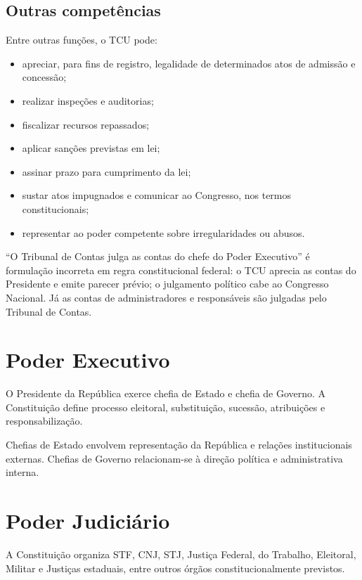 \subsection{Outras competências}

Entre outras funções, o TCU pode:
\begin{itemize}
\item apreciar, para fins de registro, legalidade de determinados atos de admissão e concessão;
\item realizar inspeções e auditorias;
\item fiscalizar recursos repassados;
\item aplicar sanções previstas em lei;
\item assinar prazo para cumprimento da lei;
\item sustar atos impugnados e comunicar ao Congresso, nos termos constitucionais;
\item representar ao poder competente sobre irregularidades ou abusos.
\end{itemize}

\begin{cebraspe}
``O Tribunal de Contas julga as contas do chefe do Poder Executivo'' é formulação incorreta em regra constitucional federal: o TCU aprecia as contas do Presidente e emite parecer prévio; o julgamento político cabe ao Congresso Nacional. Já as contas de administradores e responsáveis são julgadas pelo Tribunal de Contas.
\end{cebraspe}

\section{Poder Executivo}

O Presidente da República exerce chefia de Estado e chefia de Governo. A Constituição define processo eleitoral, substituição, sucessão, atribuições e responsabilização.

Chefias de Estado envolvem representação da República e relações institucionais externas. Chefias de Governo relacionam-se à direção política e administrativa interna.

\section{Poder Judiciário}

A Constituição organiza STF, CNJ, STJ, Justiça Federal, do Trabalho, Eleitoral, Militar e Justiças estaduais, entre outros órgãos constitucionalmente previstos.

